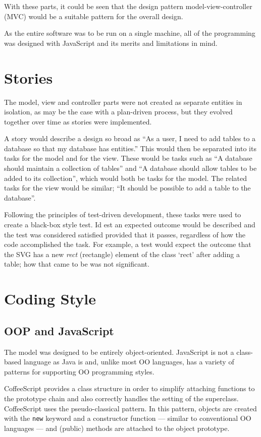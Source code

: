 With these parts, it could be seen that the design pattern model-view-controller (MVC) would be a suitable pattern for the overall design.

As the entire software was to be run on a single machine, all of the programming was designed with Java\-Script and its merits and limitations in mind.

\section{Stories}
The model, view and controller parts were not created as separate entities in isolation, as may be the case with a plan-driven process, but they evolved together over time as stories were implemented.

A story would describe a design so broad as ``As a user, I need to add tables to a database so that my database has entities.'' This would then be separated into its tasks for the model and for the view. These would be tasks such as ``A database should maintain a collection of tables'' and ``A database should allow tables to be added to its collection'', which would both be tasks for the model. The related tasks for the view would be similar; ``It should be possible to add a table to the database''.

Following the principles of test-driven development, these tasks were used to create a black-box style test. Id est an expected outcome would be described and the test was considered satisfied provided that it passes, regardless of how the code accomplished the task. For example, a test would expect the outcome that the SVG has a new \emph{rect} (rectangle) element of the class `rect' after adding a table; how that came to be was not significant.

\section{Coding Style}\label{sec:CodingStandards}
\subsection{OOP and JavaScript}
The model was designed to be entirely object-oriented. Java\-Script is not a class-based language as Java is and, unlike most OO languages, has a variety of patterns for supporting OO programming styles.

CoffeeScript provides a class structure in order to simplify attaching functions to the prototype chain and also correctly handles the setting of the superclass. Coffee\-Script uses the pseudo-classical pattern. In this pattern, objects are created with the \texttt{new} keyword and a constructor function --- similar to conventional OO languages --- and (public) methods are attached to the object prototype.

